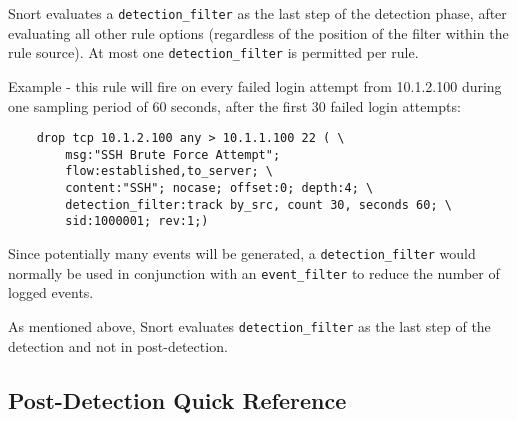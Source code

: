 \documentclass[english]{report}
\newenvironment{note}{
\samepage
    \vspace{10pt}{\textsf{
        {\hspace{7pt}\Huge{$\triangle$\hspace{-12.5pt}{\Large{$^!$}}}}\hspace{5pt}
        {\Large{NOTE}}
    }
    }
   \begin{center}
    \par\vspace{-17pt}

    \begin{lrbox}{\savepar}
    \begin{minipage}[r]{6in}
}
{
    \end{minipage}
    \end{lrbox}
    \fbox{
        \usebox{
            \savepar
	}
    }
    \par\vskip10pt
    \end{center}
}
\newenvironment{note}{
        \begin{rawhtml}
        <p><table border="1"><tr><td><b>
        Note:&nbsp;&nbsp;</b>
        \end{rawhtml}
}{
        \begin{rawhtml}
        </b></td></tr></table></p>
        \end{rawhtml}
}
\begin{document}
Snort evaluates a \texttt{detection\_filter} as the last step of the detection
phase, after evaluating all other rule options (regardless of the position of
the filter within the rule source).  At most one \texttt{detection\_filter} is
permitted per rule.

Example - this rule will fire on every failed login attempt from 10.1.2.100
during one sampling period of 60 seconds, after the first 30 failed login
attempts:

\begin{verbatim}
    drop tcp 10.1.2.100 any > 10.1.1.100 22 ( \
        msg:"SSH Brute Force Attempt";
        flow:established,to_server; \
        content:"SSH"; nocase; offset:0; depth:4; \
        detection_filter:track by_src, count 30, seconds 60; \
        sid:1000001; rev:1;)
\end{verbatim}

Since potentially many events will be generated, a \texttt{detection\_filter}
would normally be used in conjunction with an \texttt{event\_filter} to reduce
the number of logged events.

\begin{note}
As mentioned above, Snort evaluates \texttt{detection\_filter} as the last step of 
the detection and not in post-detection.
\end{note}

\subsection{Post-Detection Quick Reference}
\end{document}
